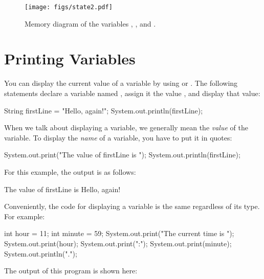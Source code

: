 \begin{figure}[!ht]
\begin{center}
\texttt{[image: figs/state2.pdf]}
\caption{Memory diagram of the variables , , and .}
\label{fig.state2}
\end{center}
\end{figure}


\section{Printing Variables}
\label{sec:printvar}

You can display the current value of a variable by using  or .
The following statements declare a variable named , assign it the value , and display that value:

\begin{code}
String firstLine = "Hello, again!";
System.out.println(firstLine);
\end{code}

%

When we talk about displaying a variable, we generally mean the {\em value} of the variable.
To display the {\em name} of a variable, you have to put it in quotes:

\begin{code}
System.out.print("The value of firstLine is ");
System.out.println(firstLine);
\end{code}

For this example, the output is as follows:

\begin{stdout}
The value of firstLine is Hello, again!
\end{stdout}

Conveniently, the code for displaying a variable is the same regardless of its type.
For example:

\begin{code}
int hour = 11;
int minute = 59;
System.out.print("The current time is ");
System.out.print(hour);
System.out.print(":");
System.out.print(minute);
System.out.println(".");
\end{code}

The output of this program is shown here:

